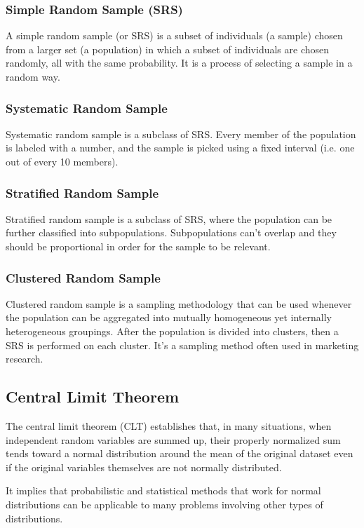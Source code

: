 \documentclass{article}
\begin{document}
\subsubsection{Simple Random Sample (SRS)}
A simple random sample (or SRS) is a subset of individuals (a sample) chosen from a larger set (a population) in which a subset of individuals are chosen randomly, all with the same probability. It is a process of selecting a sample in a random way.

\subsubsection{Systematic Random Sample}
Systematic random sample is a subclass of SRS. Every member of the population is labeled with a number, and the sample is picked using a fixed interval (i.e. one out of every 10 members).

\subsubsection{Stratified Random Sample}
Stratified random sample is a subclass of SRS, where the population can be further classified into subpopulations. Subpopulations can’t overlap and they should be proportional in order for the sample to be relevant. 

\subsubsection{Clustered Random Sample}
Clustered random sample is a sampling methodology that can be used whenever the population can be aggregated into mutually homogeneous yet internally heterogeneous groupings. 
After the population is divided into clusters, then a SRS is performed on each cluster.
It’s a sampling method often used in marketing research.

\subsection{Central Limit Theorem}
The central limit theorem (CLT) establishes that, in many situations, when independent random variables are summed up, their properly normalized sum tends toward a normal distribution around the mean of the original dataset even if the original variables themselves are not normally distributed.

It implies that probabilistic and statistical methods that work for normal distributions can be applicable to many problems involving other types of distributions.
\end{document}
